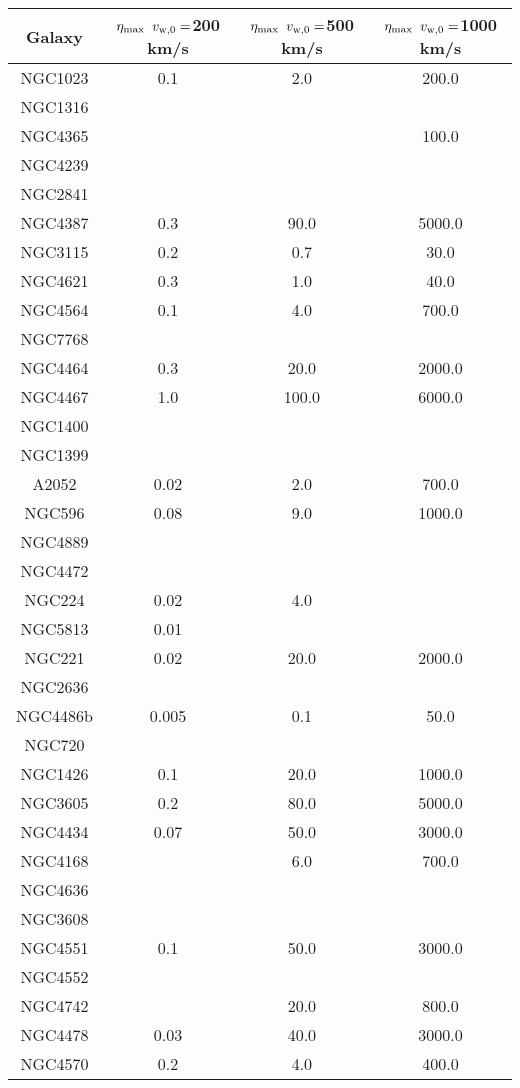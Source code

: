 \begin{table}
\begin{tabular}{cccc}
\hline
Galaxy & $\eta_{\rm max}$ $v_{\rm w,0}=$200 km/s & $\eta_{\rm max}$ $v_{\rm w,0}=$500 km/s & $\eta_{\rm max}$ $v_{\rm w,0}=$1000 km/s \\
\hline
NGC1023 & 0.1 & 2.0 & 200.0 \\
NGC1316 &  &  &  \\
NGC4365 &  &  & 100.0 \\
NGC4239 &  &  &  \\
NGC2841 &  &  &  \\
NGC4387 & 0.3 & 90.0 & 5000.0 \\
NGC3115 & 0.2 & 0.7 & 30.0 \\
NGC4621 & 0.3 & 1.0 & 40.0 \\
NGC4564 & 0.1 & 4.0 & 700.0 \\
NGC7768 &  &  &  \\
NGC4464 & 0.3 & 20.0 & 2000.0 \\
NGC4467 & 1.0 & 100.0 & 6000.0 \\
NGC1400 &  &  &  \\
NGC1399 &  &  &  \\
A2052 & 0.02 & 2.0 & 700.0 \\
NGC596 & 0.08 & 9.0 & 1000.0 \\
NGC4889 &  &  &  \\
NGC4472 &  &  &  \\
NGC224 & 0.02 & 4.0 &  \\
NGC5813 & 0.01 &  &  \\
NGC221 & 0.02 & 20.0 & 2000.0 \\
NGC2636 &  &  &  \\
NGC4486b & 0.005 & 0.1 & 50.0 \\
NGC720 &  &  &  \\
NGC1426 & 0.1 & 20.0 & 1000.0 \\
NGC3605 & 0.2 & 80.0 & 5000.0 \\
NGC4434 & 0.07 & 50.0 & 3000.0 \\
NGC4168 &  & 6.0 & 700.0 \\
NGC4636 &  &  &  \\
NGC3608 &  &  &  \\
NGC4551 & 0.1 & 50.0 & 3000.0 \\
NGC4552 &  &  &  \\
NGC4742 &  & 20.0 & 800.0 \\
NGC4478 & 0.03 & 40.0 & 3000.0 \\
NGC4570 & 0.2 & 4.0 & 400.0 \\

\end{tabular}
\end{table}
